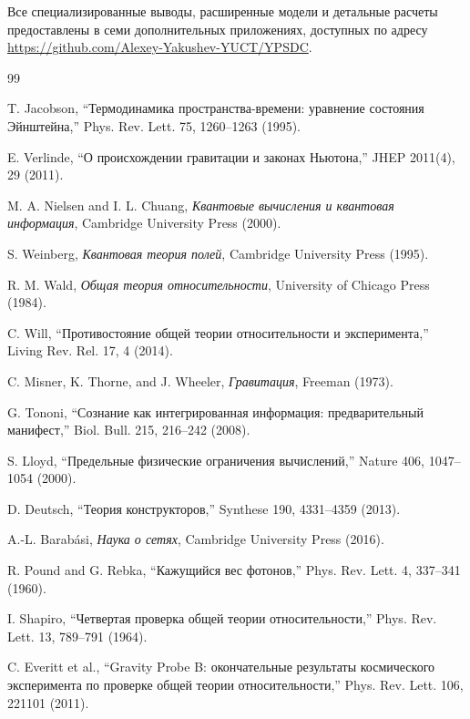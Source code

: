 \documentclass[11pt,a4paper]{article}
\begin{document}
	Все специализированные выводы, расширенные модели и детальные расчеты 
	предоставлены в семи дополнительных приложениях, доступных по адресу 
	\url{https://github.com/Alexey-Yakushev-YUCT/YPSDC}.
	\begin{thebibliography}{99}
		
		 T. Jacobson, ``Термодинамика пространства-времени: уравнение состояния Эйнштейна,'' Phys. Rev. Lett. 75, 1260–1263 (1995).
		
		 E. Verlinde, ``О происхождении гравитации и законах Ньютона,'' JHEP 2011(4), 29 (2011).
		
		 M. A. Nielsen and I. L. Chuang, \emph{Квантовые вычисления и квантовая информация}, Cambridge University Press (2000).
		
		 S. Weinberg, \emph{Квантовая теория полей}, Cambridge University Press (1995).
		
		 R. M. Wald, \emph{Общая теория относительности}, University of Chicago Press (1984).
		
		 C. Will, ``Противостояние общей теории относительности и эксперимента,'' Living Rev. Rel. 17, 4 (2014).
		
		 C. Misner, K. Thorne, and J. Wheeler, \emph{Гравитация}, Freeman (1973).
		
		 G. Tononi, ``Сознание как интегрированная информация: предварительный манифест,'' Biol. Bull. 215, 216–242 (2008).
		
		 S. Lloyd, ``Предельные физические ограничения вычислений,'' Nature 406, 1047–1054 (2000).
		
		 D. Deutsch, ``Теория конструкторов,'' Synthese 190, 4331–4359 (2013).
		
		 A.-L. Barabási, \emph{Наука о сетях}, Cambridge University Press (2016).
		
		 R. Pound and G. Rebka, ``Кажущийся вес фотонов,'' Phys. Rev. Lett. 4, 337–341 (1960).
		
		 I. Shapiro, ``Четвертая проверка общей теории относительности,'' Phys. Rev. Lett. 13, 789–791 (1964).
		
		 C. Everitt et al., ``Gravity Probe B: окончательные результаты космического эксперимента по проверке общей теории относительности,'' Phys. Rev. Lett. 106, 221101 (2011).
		

\end{thebibliography}
\end{document}
